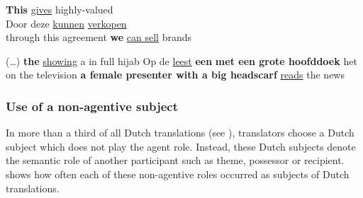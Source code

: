 \documentclass[output=paper]{LSP/langsci}
\begin{document}
\ea \label{ex:5:13}
\ea
\textbf{This}  \ul{gives}  highly-valued \\[1em]
\ex Door deze  \ul{kunnen}   \ul{verkopen}\\
through this agreement \textbf{we} \ul{can sell} brands
\z
\z


\ea \label{ex:5:14}
\ea
(\dots) \textbf{the}  \ul{showing} a  in full hijab
\ex
Op de  \ul{leest} \textbf{een}  \textbf{met een grote hoofddoek} het \\[1em]
on the television \textbf{a female presenter with a big headscarf} \ul{reads} the news
\z
\z


\subsubsection{Use of a non-agentive subject} \label{sec:5:6:2:2}

In more than a third of all Dutch translations (see ), translators choose a Dutch subject which does not play the agent role. Instead, these Dutch subjects denote the semantic role of another participant such as theme, possessor or recipient.  shows how often each of these non-agentive roles occurred as subjects of Dutch translations.

\begin{table}
     \centering
     \caption{Dutch translations with non-agentive subjects}
     \label{tab:5.4}
\end{table}
  
\end{document}
